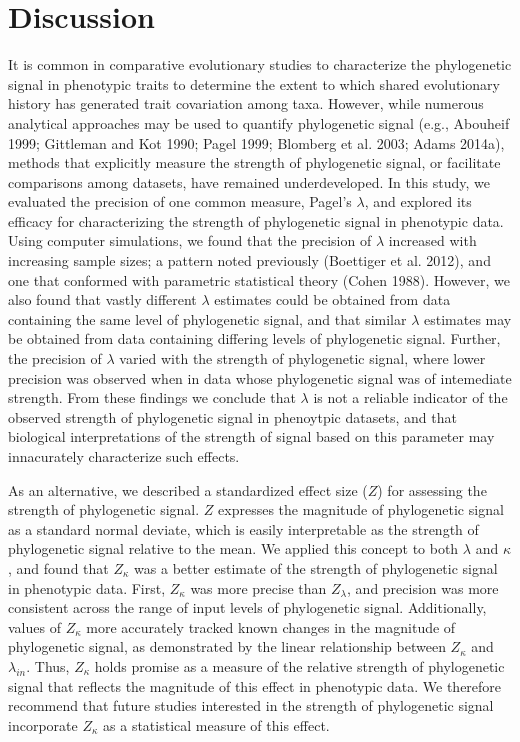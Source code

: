 \documentclass[]{article}
\begin{document}
\hypertarget{discussion}{%
\section{Discussion}\label{discussion}}

It is common in comparative evolutionary studies to characterize the
phylogenetic signal in phenotypic traits to determine the extent to
which shared evolutionary history has generated trait covariation among
taxa. However, while numerous analytical approaches may be used to
quantify phylogenetic signal (e.g., Abouheif 1999; Gittleman and Kot
1990; Pagel 1999; Blomberg et al. 2003; Adams 2014a), methods that
explicitly measure the strength of phylogenetic signal, or facilitate
comparisons among datasets, have remained underdeveloped. In this study,
we evaluated the precision of one common measure, Pagel's \(\lambda\),
and explored its efficacy for characterizing the strength of
phylogenetic signal in phenotypic data. Using computer simulations, we
found that the precision of \(\lambda\) increased with increasing sample
sizes; a pattern noted previously (Boettiger et al. 2012), and one that
conformed with parametric statistical theory (Cohen 1988). However, we
also found that vastly different \(\lambda\) estimates could be obtained
from data containing the same level of phylogenetic signal, and that
similar \(\lambda\) estimates may be obtained from data containing
differing levels of phylogenetic signal. Further, the precision of
\(\lambda\) varied with the strength of phylogenetic signal, where lower
precision was observed when in data whose phylogenetic signal was of
intemediate strength. From these findings we conclude that \(\lambda\)
is not a reliable indicator of the observed strength of phylogenetic
signal in phenoytpic datasets, and that biological interpretations of
the strength of signal based on this parameter may innacurately
characterize such effects. \hfill\break

As an alternative, we described a standardized effect size (\(Z\)) for
assessing the strength of phylogenetic signal. \(Z\) expresses the
magnitude of phylogenetic signal as a standard normal deviate, which is
easily interpretable as the strength of phylogenetic signal relative to
the mean. We applied this concept to both \(\lambda\) and \(\kappa\),
and found that \(Z_\kappa\) was a better estimate of the strength of
phylogenetic signal in phenotypic data. First, \(Z_\kappa\) was more
precise than \(Z_\lambda\), and precision was more consistent across the
range of input levels of phylogenetic signal. Additionally, values of
\(Z_\kappa\) more accurately tracked known changes in the magnitude of
phylogenetic signal, as demonstrated by the linear relationship between
\(Z_\kappa\) and \(\lambda_{in}\). Thus, \(Z_\kappa\) holds promise as a
measure of the relative strength of phylogenetic signal that reflects
the magnitude of this effect in phenotypic data. We therefore recommend
that future studies interested in the strength of phylogenetic signal
incorporate \(Z_\kappa\) as a statistical measure of this effect.
\hfill\break
\end{document}
